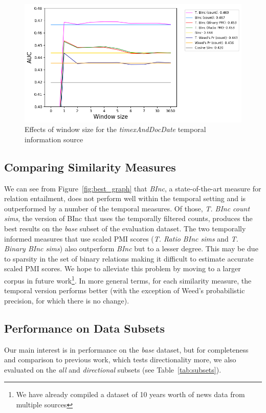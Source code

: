 \documentclass[11pt]{article}
\begin{document}
\begin{figure}[h]
\begin{center}
\includegraphics[width=12.5cm]{auc_window.png}
\end{center}
\caption{Effects of window size for the \textit{timexAndDocDate} temporal information source}
\label{fig:window_size}
\end{figure}

\subsection{Comparing Similarity Measures}
\label{sec:results_simmeasures}

We can see from Figure~\ref{fig:best_graph} that \textit{BInc}, a state-of-the-art measure for relation entailment, does not perform well within the temporal setting and is outperformed by a number of the temporal measures. Of those, \textit{T. BInc count sims}, the version of BInc that uses the temporally filtered counts, produces the best results on the \textit{base} subset of the evaluation dataset. The two temporally informed measures that use scaled PMI scores (\textit{T. Ratio BInc sims} and \textit{T. Binary BInc sims}) also outperform \textit{BInc} but to a lesser degree. This may be due to sparsity in the set of binary relations making it difficult to estimate accurate scaled PMI scores. We hope to alleviate this problem by moving to a larger corpus in future work\footnote{We have already compiled a dataset of 10 years worth of news data from multiple sources}. In more general terms, for each similarity measure, the temporal version performs better (with the exception of Weed's probabilistic precision, for which there is no change).

\subsection{Performance on Data Subsets}
\label{sec:results_data_subsets}
Our main interest is in performance on the \textit{base} dataset, but for completeness and comparison to previous work, which tests directionality more, we also evaluated on the \textit{all} and \textit{directional} subsets (see Table~\ref{tab:subsets}).
\end{document}
